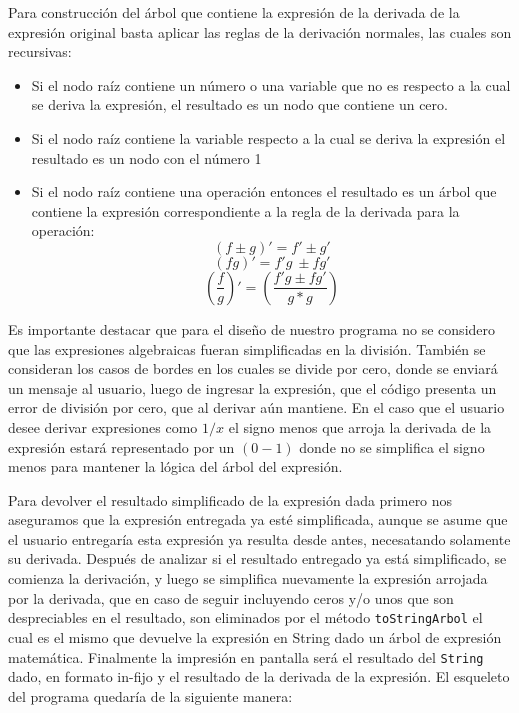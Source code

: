 \documentclass[letterpaper,11pt]{article} %
\begin{document}
\newp Para construcción del árbol que contiene la expresión de la derivada de la expresión original basta aplicar las reglas de la derivación normales, las cuales son recursivas:
\begin{itemize}
\item Si el nodo raíz contiene un número o una variable que no es respecto a la cual se deriva la
expresión, el resultado es un nodo que contiene un cero.
\item Si el nodo raíz contiene la variable respecto a la cual se deriva la expresión el resultado es 
un nodo con el número 1
\item Si el nodo raíz contiene una operación entonces el resultado es un árbol que contiene la 
expresión correspondiente a la regla de la derivada para la operación:
$$(f \pm g )' = f'\pm g' $$
$$ (fg)' = f'g\  \pm fg'$$
$$\left(\frac{f}{g}\right)' = \left( \frac{f'g  \pm fg'}{g*g} \right)$$
\end{itemize}
\newp Es importante destacar que para el diseño de nuestro programa no se considero que las expresiones algebraicas fueran simplificadas en la división. También se consideran los casos de bordes en los cuales se divide por cero, donde se enviará un mensaje al usuario, luego de ingresar la expresión, que el código presenta un error de división por cero, que al derivar aún mantiene.
\newp En el caso que el usuario desee derivar expresiones como $1/x$ el signo menos que arroja la derivada de la expresión estará representado por un $(0 - 1)$ donde no se simplifica el signo menos para mantener la lógica del árbol del expresión.

Para devolver el resultado simplificado de la expresión dada primero nos aseguramos que la expresión entregada ya esté simplificada, aunque se asume que el usuario entregaría esta expresión ya resulta desde antes, necesatando solamente su derivada.
\newp Después de analizar si el resultado entregado ya está simplificado, se comienza la derivación, y luego se simplifica nuevamente la expresión arrojada por la derivada, que en caso de seguir incluyendo ceros y/o unos que son despreciables en el resultado, son eliminados por el método \texttt{toStringArbol} el cual es el mismo que devuelve la expresión en String dado un árbol de expresión matemática.
\newp Finalmente la impresión en pantalla será el resultado del \texttt{String} dado, en formato in-fijo y el resultado de la derivada de la expresión.
\newp El esqueleto del programa quedaría de la siguiente manera:
\end{document}

